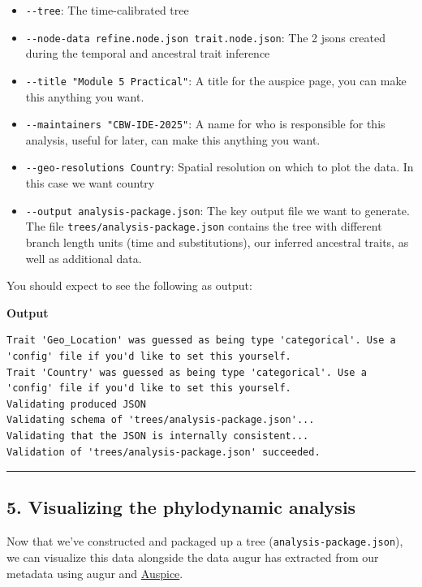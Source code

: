 \documentclass[
]{book}
\providecommand{\tightlist}{%
  \setlength{\itemsep}{0pt}\setlength{\parskip}{0pt}}
\begin{document}
\begin{itemize}
\tightlist
\item
  \texttt{-\/-tree}: The time-calibrated tree
\item
  \texttt{-\/-node-data\ refine.node.json\ trait.node.json}: The 2 jsons created during the temporal and ancestral trait inference
\item
  \texttt{-\/-title\ "Module\ 5\ Practical"}: A title for the auspice page, you can make this anything you want.
\item
  \texttt{-\/-maintainers\ "CBW-IDE-2025"}: A name for who is responsible for this analysis, useful for later, can make this anything you want.
\item
  \texttt{-\/-geo-resolutions\ Country}: Spatial resolution on which to plot the data. In this case we want country
\item
  \texttt{-\/-output\ analysis-package.json}: The key output file we want to generate. The file \texttt{trees/analysis-package.json} contains the tree with different branch length units (time and substitutions), our inferred ancestral traits, as well as additional data.
\end{itemize}

You should expect to see the following as output:

\textbf{Output}

\begin{verbatim}
Trait 'Geo_Location' was guessed as being type 'categorical'. Use a 'config' file if you'd like to set this yourself.
Trait 'Country' was guessed as being type 'categorical'. Use a 'config' file if you'd like to set this yourself.
Validating produced JSON
Validating schema of 'trees/analysis-package.json'...
Validating that the JSON is internally consistent...
Validation of 'trees/analysis-package.json' succeeded.
\end{verbatim}

\begin{center}\rule{0.5\linewidth}{0.5pt}\end{center}

\subsection{5. Visualizing the phylodynamic analysis}\label{visualizing-the-phylodynamic-analysis}

Now that we've constructed and packaged up a tree (\texttt{analysis-package.json}), we can visualize this data alongside the data augur has extracted from our metadata using augur and \href{https://auspice.us/}{Auspice}.
\end{document}
